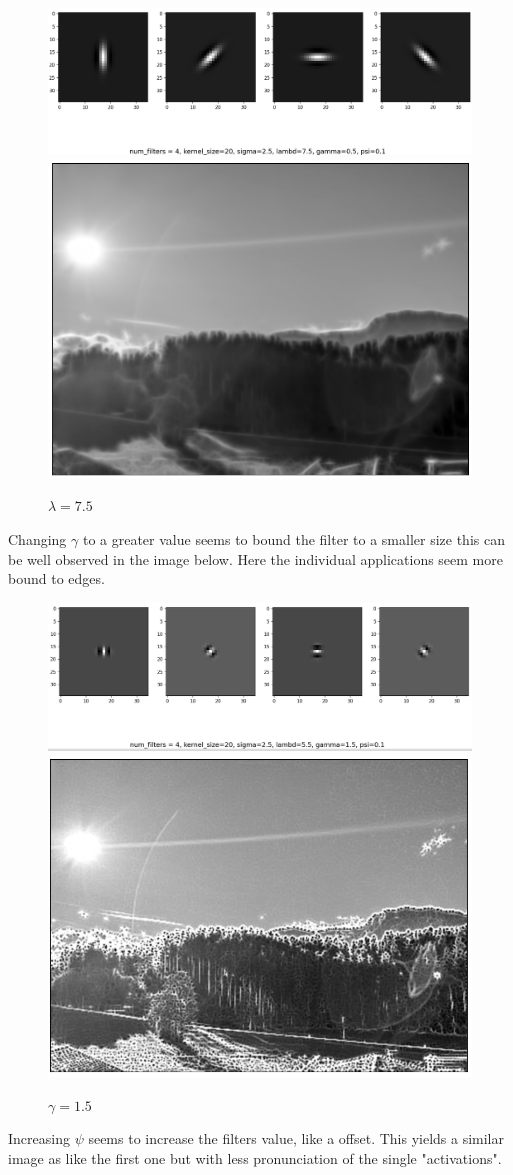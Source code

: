 \documentclass[UTF-8]{article}
\begin{document}
\begin{figure}[H]
	\centering
	\includegraphics[width=0.7\linewidth]{task4_3}
	\includegraphics[width=0.7\linewidth]{task4_4}
	\caption{$\lambda = 7.5$}
	\label{fig:task42}
\end{figure}
\newpage
Changing $\gamma$ to a greater value seems to bound the filter to a smaller size this can be well observed in the image below. Here the individual applications seem more bound to edges.

\begin{figure}[H]
	\centering
	\includegraphics[width=0.7\linewidth]{task4_5}
	\includegraphics[width=0.7\linewidth]{task4_6}
	\caption{$\gamma = 1.5$}
	\label{fig:task43}
\end{figure}
\newpage
Increasing $\psi$ seems to increase the filters value, like a offset. This yields a similar image as like the first one but with less pronunciation of the single "activations".
\end{document}
